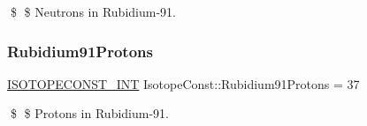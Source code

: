 \$ \$ Neutrons in Rubidium-\/91. \mbox{\label{group___isotope_const-_rubidium-_rb91_ga0421e2de003c05dbce909e3704360c5a}} 
\subsubsection{\texorpdfstring{Rubidium91\+Protons}{Rubidium91Protons}}
{\footnotesize\ttfamily \mbox{\hyperlink{group___isotope_const-_macros_ga5f18360b3e99483a35c32d789e62621c}{I\+S\+O\+T\+O\+P\+E\+C\+O\+N\+S\+T\+\_\+\+I\+NT}} Isotope\+Const\+::\+Rubidium91\+Protons = 37}

\$ \$ Protons in Rubidium-\/91. 